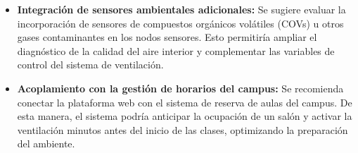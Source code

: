 \begin{itemize}
    \item \textbf{Integración de sensores ambientales adicionales:} Se sugiere evaluar la incorporación de sensores de compuestos orgánicos volátiles (COVs) u otros gases contaminantes en los nodos sensores. Esto permitiría ampliar el diagnóstico de la calidad del aire interior y complementar las variables de control del sistema de ventilación.

    \item \textbf{Acoplamiento con la gestión de horarios del campus:} Se recomienda conectar la plataforma web con el sistema de reserva de aulas del campus. De esta manera, el sistema podría anticipar la ocupación de un salón y activar la ventilación minutos antes del inicio de las clases, optimizando la preparación del ambiente.
\end{itemize}
